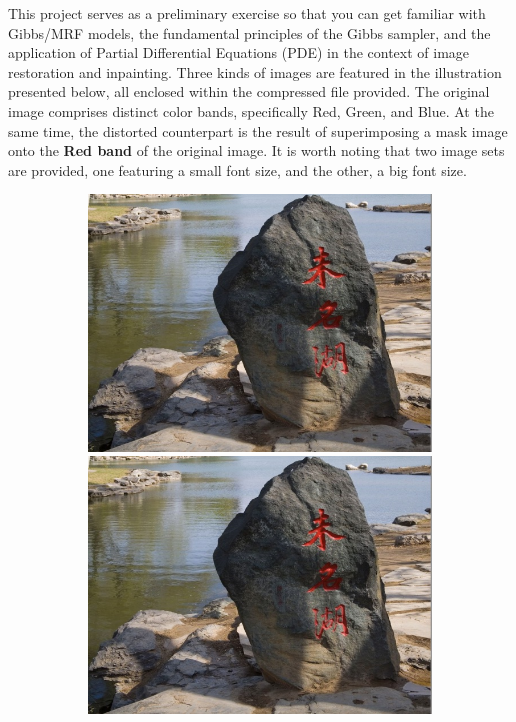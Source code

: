 \documentclass[11pt]{article}
\begin{document}
This project serves as a preliminary exercise so that you can get familiar with Gibbs/MRF models, the fundamental principles of the Gibbs sampler, and the application of Partial Differential Equations (PDE) in the context of image restoration and inpainting. Three kinds of images are featured in the illustration presented below, all enclosed within the compressed file provided. The original image comprises distinct color bands, specifically Red, Green, and Blue. At the same time, the distorted counterpart is the result of superimposing a mask image onto the \textbf{Red band} of the original image. It is worth noting that two image sets are provided, one featuring a small font size, and the other, a big font size.
\begin{figure}[ht!]
    \centering
    \hfill%
    \begin{subfigure}[]{0.333\linewidth}
        \centering
        \includegraphics[width=\linewidth]{fig/stone_ori.jpg}
        \includegraphics[width=\linewidth]{fig/stone_ori.jpg}

\end{subfigure}
\end{figure}
\end{document}
